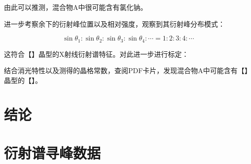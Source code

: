\documentclass{thuemp}
\begin{document}
由此可以推测，混合物A中很可能含有氯化钠。

进一步考察余下的衍射峰位置以及相对强度，观察到其衍射峰分布模式：

\begin{equation}
    \sin{\theta_1} : \sin{\theta_2} :\sin{\theta_3} : \sin{\theta_4} : \cdots = 1 : 2 : 3 : 4 : \cdots
    \label{eq:mixture_a_diff_patt}
\end{equation}

这符合【】晶型的X射线衍射谱特征。对此进一步进行标定：

结合消光特性以及测得的晶格常数，查阅PDF卡片，发现混合物A中可能含有【】晶型的【】。

\section{结论}



\renewcommand\refname{\heiti\wuhao\centerline{参考文献}\global\def\refname{参考文献}}
\vskip 12pt


\let\OLDthebibliography\thebibliography
\renewcommand\thebibliography[1]{
  \OLDthebibliography{#1}
  \setlength{\parskip}{0pt}
  \setlength{\itemsep}{0pt plus 0.3ex}
}

{
\renewcommand{\baselinestretch}{0.9}
\liuhao


}

\appendix
\section{衍射谱寻峰数据}
\end{document}
